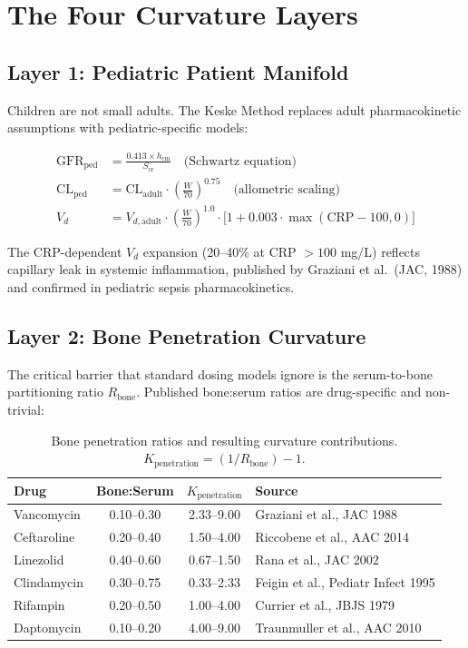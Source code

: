 \documentclass[11pt]{article}
\begin{document}
\section{The Four Curvature Layers}

\subsection{Layer 1: Pediatric Patient Manifold}

Children are not small adults. The Keske Method replaces adult pharmacokinetic
assumptions with pediatric-specific models:

\begin{align}
  \text{GFR}_{\text{ped}} &= \frac{0.413 \times h_{\text{cm}}}{S_{\text{cr}}} \quad
    \text{(Schwartz equation)} \\[4pt]
  \text{CL}_{\text{ped}} &= \text{CL}_{\text{adult}} \cdot
    \left(\frac{W}{70}\right)^{0.75} \quad
    \text{(allometric scaling)} \\[4pt]
  V_d &= V_{d,\text{adult}} \cdot \left(\frac{W}{70}\right)^{1.0}
    \cdot \bigl[1 + 0.003 \cdot \max(\text{CRP} - 100, 0)\bigr]
\end{align}

The CRP-dependent $V_d$ expansion (20--40\% at CRP $>100$ mg/L) reflects
capillary leak in systemic inflammation, published by Graziani et al.\ (JAC, 1988)
and confirmed in pediatric sepsis pharmacokinetics.

\subsection{Layer 2: Bone Penetration Curvature}

The critical barrier that standard dosing models ignore is the serum-to-bone
partitioning ratio $R_{\text{bone}}$. Published bone:serum ratios are
drug-specific and non-trivial:

\begin{table}[h!]
\centering
\small
\begin{tabular}{lccl}
\toprule
\textbf{Drug} & \textbf{Bone:Serum} & \textbf{$K_{\text{penetration}}$} & \textbf{Source} \\
\midrule
Vancomycin   & 0.10--0.30 & 2.33--9.00 & Graziani et al., JAC 1988 \\
Ceftaroline  & 0.20--0.40 & 1.50--4.00 & Riccobene et al., AAC 2014 \\
Linezolid    & 0.40--0.60 & 0.67--1.50 & Rana et al., JAC 2002 \\
Clindamycin  & 0.30--0.75 & 0.33--2.33 & Feigin et al., Pediatr Infect 1995 \\
Rifampin     & 0.20--0.50 & 1.00--4.00 & Currier et al., JBJS 1979 \\
Daptomycin   & 0.10--0.20 & 4.00--9.00 & Traunmuller et al., AAC 2010 \\
\bottomrule
\end{tabular}
\caption{Bone penetration ratios and resulting curvature contributions.
$K_{\text{penetration}} = (1/R_{\text{bone}}) - 1$.}
\end{table}
\end{document}
